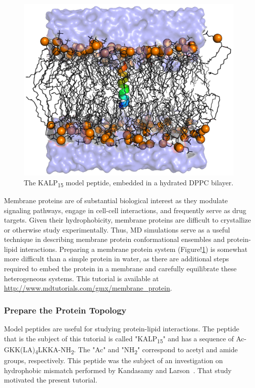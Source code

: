\documentclass[9pt,tutorial,pubversion]{livecoms}
\newcommand{\urlstring}{http://www.mdtutorials.com/gmx}
\newcommand{\tutorialkalp}{\url{\urlstring/membrane_protein}}
\begin{document}
\begin{figure}[H]
\centering
\includegraphics{kalp15_dppc}
\caption{The KALP\textsubscript{15} model peptide, embedded in a hydrated DPPC bilayer.}
\label{kalp_dppc_fig}
\end{figure}

Membrane proteins are of substantial biological interest as they modulate signaling pathways, engage in cell-cell interactions, and frequently serve as drug targets. Given their hydrophobicity, membrane proteins are difficult to crystallize or otherwise study experimentally. Thus, MD simulations serve as a useful technique in describing membrane protein conformational ensembles and protein-lipid interactions. Preparing a membrane protein system (Figure!\ref{kalp_dppc_fig}) is somewhat more difficult than a simple protein in water, as there are additional steps required to embed the protein in a membrane and carefully equilibrate these heterogeneous systems. This tutorial is available at \tutorialkalp.

\subsubsection{Prepare the Protein Topology} \label{kalp_protein_topology}

Model peptides are useful for studying protein-lipid interactions. The peptide that is the subject of this tutorial is called "KALP\textsubscript{15}" and has a sequence of Ac-GKK(LA)\textsubscript{4}LKKA-NH\textsubscript{2}. The "Ac" and "NH\textsubscript{2}" correspond to acetyl and amide groups, respectively. This peptide was the subject of an investigation on hydrophobic mismatch performed by Kandasamy and Larson~\cite{Kandasamy2006}. That study motivated the present tutorial.
\end{document}
